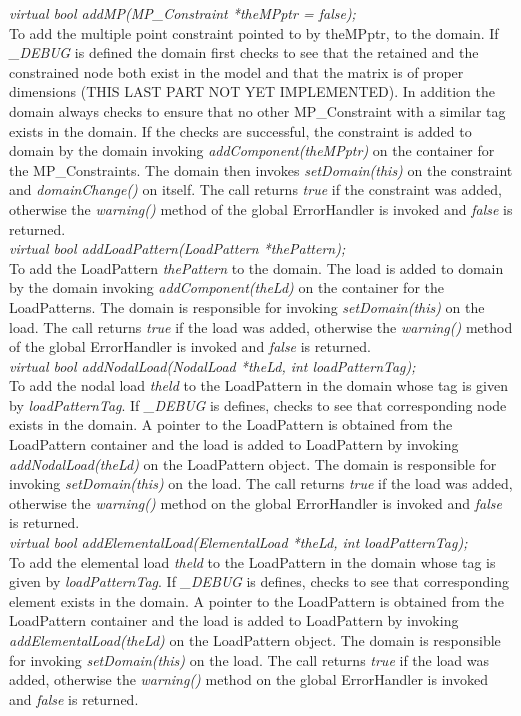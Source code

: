 {\em virtual bool addMP(MP\_Constraint *theMPptr = false);}  \\
To add the multiple point constraint pointed to by theMPptr, to the
domain. If {\em \_DEBUG} is defined the domain first
checks to see that the retained and the constrained node both exist
in the model and that the matrix is of proper dimensions (THIS LAST
PART NOT YET IMPLEMENTED). 
In addition the domain always checks to ensure that no other
MP\_Constraint with a similar tag exists in the domain. If the checks are
successful, the constraint is added to domain by the domain invoking {\em
addComponent(theMPptr)} on the container for the MP\_Constraints. The
domain then invokes {\em setDomain(this)} on the 
constraint and {\em domainChange()} on itself. The call returns {\em
true} if the constraint was added, otherwise the {\em warning()} method of
the global ErrorHandler is invoked and {\em false} is returned.\\


{\em virtual bool addLoadPattern(LoadPattern *thePattern);}  \\ 
To add the LoadPattern {\em thePattern} to the domain.
The load is added to domain by the domain invoking {\em
addComponent(theLd)} on the container for the LoadPatterns. The domain
is responsible for invoking {\em setDomain(this)} on the load. The
call returns {\em true} if the load was added, otherwise the {\em
warning()} method of the global ErrorHandler is invoked and {\em
false} is returned.\\ 

{\em virtual bool addNodalLoad(NodalLoad *theLd, int loadPatternTag);}  \\ 
To add the nodal load {\em theld} to the LoadPattern in the domain
whose tag is given by {\em loadPatternTag}.
If {\em \_DEBUG} is defines, checks to see that corresponding node
exists in the domain. A pointer to the LoadPattern is obtained from
the LoadPattern container and the load is added to LoadPattern by
invoking {\em addNodalLoad(theLd)} on the LoadPattern object. The
domain is responsible for invoking {\em setDomain(this)} on the
load. The call returns {\em true} if the load was added, otherwise the
{\em warning()} method on the global ErrorHandler is invoked and {\em
false} is returned.\\ 


{\em virtual bool addElementalLoad(ElementalLoad *theLd, int loadPatternTag);}  \\ 
To add the elemental load {\em theld} to the LoadPattern in the domain
whose tag is given by {\em loadPatternTag}.
If {\em \_DEBUG} is defines, checks to see that corresponding element
exists in the domain. A pointer to the LoadPattern is obtained from
the LoadPattern container and the load is added to LoadPattern by
invoking {\em addElementalLoad(theLd)} on the LoadPattern object. The
domain is responsible for invoking {\em setDomain(this)} on the
load. The call returns {\em true} if the load was added, otherwise the
{\em warning()} method on the global ErrorHandler is invoked and {\em
false} is returned.\\ 


